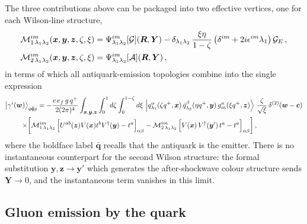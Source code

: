 \documentclass[11pt,a4paper]{article}
\newcommand{\ket}[1]{\left|#1\right\rangle}
\newcommand{\calG}{\mathcal{G}}
\newcommand{\calA}{\mathcal{A}}
\newcommand{\calM}{\mathcal{M}}
\newcommand{\vx}{\bm{x}}
\newcommand{\vy}{\bm{y}}
\newcommand{\vz}{\bm{z}}
\newcommand{\vw}{\bm{w}}
\newcommand{\vc}{\bm{c}}
\newcommand{\vR}{\bm{R}}
\newcommand{\vY}{\bm{Y}}
\numberwithin{equation}{section}
\begin{document}
The three contributions above can be packaged into two effective vertices, one for each
Wilson-line structure,
\begin{align}
\label{eq:M12}
\calM^{im}_{1\,\lambda_{1}\lambda_{2}}(\vx,\vy,\vz,\zeta,\xi) &=
\Psi^{im}_{\lambda_{1}\lambda_{2}}[\calG](\vR,\vY)
- \delta_{\lambda_{1}\lambda_{2}}\,\frac{\xi\eta}{1-\zeta}\,
\big(\delta^{im}+2i\epsilon^{im}\lambda_{1}\big)\,\calG_{E}\,,\notag\\
\calM^{im}_{2\,\lambda_{1}\lambda_{2}}(\vx,\vy,\vz,\zeta,\xi) &=
\Psi^{im}_{\lambda_{1}\lambda_{2}}[\calA](\vR,\vY)\,,
\end{align}
in terms of which all antiquark-emission topologies combine into the single expression
\begin{align}
\label{eq:wfqbar}
\ket{\gamma^{i}(\vw)}_{q\bm{\bar q}g} = -\frac{e\,e_{f}\,g\,q^{+}}{2(2\pi)^{4}}
\int_{\vx,\vy,\vz} \int_{0}^{1} d\zeta \int_{0}^{1-\zeta} d\xi\,&
\ket{q^{\alpha}_{\lambda_{1}}(\zeta q^{+},\vx)\,\bar{q}^{\beta}_{\lambda_{2}}(\eta q^{+},\vy)\,
g^{a}_{m}(\xi q^{+},\vz)}\,\frac{\zeta}{\sqrt{\xi}}\,\delta^{(2)}(\vw-\vc) \notag\\
\times\bigg[\calM^{im}_{1\,\lambda_{1}\lambda_{2}}\,
\Big[U^{ab}(\vz)V(\vx)t^{b}V^{\dagger}(\vy)-t^{a}\Big]_{\alpha\beta}
&- \calM^{im}_{2\,\lambda_{1}\lambda_{2}}\,
\Big[V(\vx)\,V^{\dagger}(\vy')\,t^{a}-t^{a}\Big]_{\alpha\beta}\bigg]\,,
\end{align}
where the boldface label $\bm{\bar q}$ recalls that the antiquark is the emitter. There is no
instantaneous counterpart for the second Wilson structure: the formal substitution
$\vy,\vz\to\vy'$ which generates the after-shockwave colour structure sends $\vY\to 0$, and the
instantaneous term vanishes in this limit.

\subsection{Gluon emission by the quark}
\label{sec:quarkemission}
\end{document}

